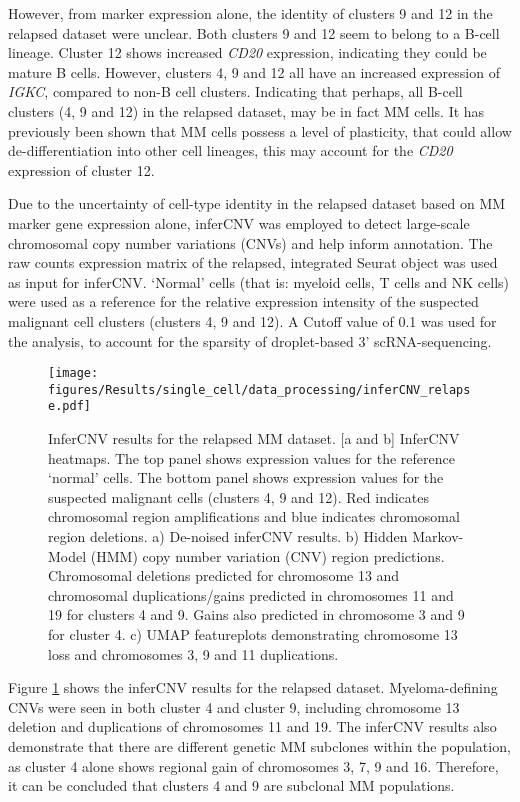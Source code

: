 However, from marker expression alone, the identity of clusters 9 and 12 in the relapsed dataset were unclear.
Both clusters 9 and 12 seem to belong to a B-cell lineage.
Cluster 12 shows increased \textit{CD20} expression, indicating they could be mature B cells.
However, clusters 4, 9 and 12 all have an increased expression of \textit{IGKC}, compared to non-B cell clusters.
Indicating that perhaps, all B-cell clusters (4, 9 and 12) in the relapsed dataset, may be in fact MM cells.
It has previously been shown that MM cells possess a level of plasticity, that could allow de-differentiation into other cell lineages\cite{kotouvcek2014myeloma}, this may account for the \textit{CD20} expression of cluster 12.

Due to the uncertainty of cell-type identity in the relapsed dataset based on MM marker gene expression alone, inferCNV\cite{patel2014single, infercnv2014} was employed to detect large-scale chromosomal copy number variations (CNVs) and help inform annotation.
The raw counts expression matrix of the relapsed, integrated Seurat object was used as input for inferCNV\@.
`Normal' cells (that is: myeloid cells, T cells and NK cells) were used as a reference for the relative expression intensity of the suspected malignant cell clusters (clusters 4, 9 and 12).
A Cutoff value of 0.1 was used for the analysis, to account for the sparsity of droplet-based 3' scRNA-sequencing.
%
\begin{figure}[htb]
    \centering
    \texttt{[image: figures/Results/single\_cell/data\_processing/inferCNV\_relapse.pdf]}
    \caption[inferCNV- relapsed MM]{InferCNV results for the relapsed MM dataset.
    [a and b] InferCNV heatmaps.
        The top panel shows expression values for the reference `normal' cells.
        The bottom panel shows expression values for the suspected malignant cells (clusters 4, 9 and 12).
        Red indicates chromosomal region amplifications and blue indicates chromosomal region deletions.
    a) De-noised inferCNV results.
    b) Hidden Markov-Model (HMM) copy number variation (CNV) region predictions.
        Chromosomal deletions predicted for chromosome 13 and chromosomal duplications/gains predicted in chromosomes 11 and 19 for clusters 4 and 9.
        Gains also predicted in chromosome 3 and 9 for cluster 4.
    c) UMAP featureplots demonstrating chromosome 13 loss and chromosomes 3, 9 and 11 duplications.
    }
    \label{fig:inferCNV_relapse}
\end{figure}
%
Figure \ref{fig:inferCNV_relapse} shows the inferCNV results for the relapsed dataset.
Myeloma-defining CNVs were seen in both cluster 4 and cluster 9, including chromosome 13 deletion and duplications of chromosomes 11 and 19.
The inferCNV results also demonstrate that there are different genetic MM subclones within the population, as cluster 4 alone shows regional gain of chromosomes 3, 7, 9 and 16.
Therefore, it can be concluded that clusters 4 and 9 are subclonal MM populations.

